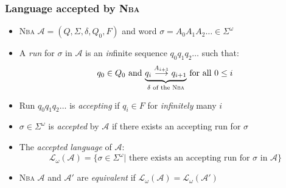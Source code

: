 \documentclass[a4paper, 10pt]{article}
\begin{document}
\subsubsection*{Language accepted by \textsc{Nba}}
\begin{itemize}
    \item \textsc{Nba} $\mathcal{A}=(Q,\Sigma,\delta,Q_0,F)$ and word $\sigma=A_0A_1A_2\dots\in\Sigma^\omega$
    \item A \emph{run} for $\sigma$ in $\mathcal{A}$ is an \emph{in}finite sequence $q_0q_1q_2\dots$ such that:
    \[ q_0\in Q_0 \textrm{ and }  \underset{\delta \textrm{ of the \textsc{Nba}}}{\underbrace{q_i \overset{A_{i+1}}{\longrightarrow} q_{i+1}}} \textrm{ for all } 0\leq i \]
    \item Run $q_0q_1q_2\dots$ is \emph{accepting} if $q_i\in F$ for \emph{infinitely} many $i$
    \item $\sigma\in\Sigma^\omega$ is \emph{accepted} by $\mathcal{A}$ if there exists an accepting run for $\sigma$
    \item The \emph{accepted language} of $\mathcal{A}$:
    \[ \mathcal{L}_\omega(\mathcal{A})=\{ \sigma\in\Sigma^\omega | \textrm{ there exists an accepting run for } \sigma \textrm{ in } \mathcal{A}\} \]
    \item \textsc{Nba} $\mathcal{A}$ and $\mathcal{A}'$ are \emph{equivalent} if $\mathcal{L}_\omega(\mathcal{A})=\mathcal{L}_\omega(\mathcal{A}') $
\end{itemize}
\end{document}
